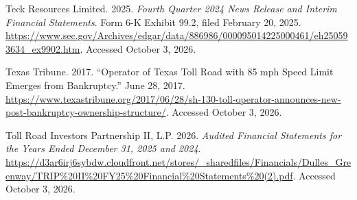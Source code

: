 \begin{sloppypar}
\begin{sources}
\item Teck Resources Limited. 2025. \textit{Fourth Quarter 2024 News Release and Interim Financial Statements}. Form 6-K Exhibit 99.2, filed February 20, 2025. \url{https://www.sec.gov/Archives/edgar/data/886986/000095014225000461/eh250593634_ex9902.htm}. Accessed October 3, 2026.
\item Texas Tribune. 2017. ``Operator of Texas Toll Road with 85 mph Speed Limit Emerges from Bankruptcy.'' June 28, 2017. \url{https://www.texastribune.org/2017/06/28/sh-130-toll-operator-announces-new-post-bankruptcy-ownership-structure/}. Accessed October 3, 2026.
\item Toll Road Investors Partnership II, L.P. 2026. \textit{Audited Financial Statements for the Years Ended December 31, 2025 and 2024}. \url{https://d3ar6irj6sybdw.cloudfront.net/stores/_sharedfiles/Financials/Dulles_Greenway/TRIP%20II%20FY25%20Financial%20Statements%20(2).pdf}. Accessed October 3, 2026.
\end{sources}
\end{sloppypar}
